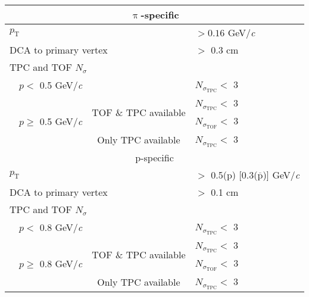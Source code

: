\documentclass[ALICE,manyauthors]{cernphprep}
\newcommand{\Lam}{$\Lambda$\xspace}
\providecommand{\DIFaddtex}[1]{{\protect\color{blue}\uwave{#1}}} %
\providecommand{\DIFdeltex}[1]{{\protect\color{red}\sout{#1}}}                      %
\providecommand{\DIFaddFL}[1]{\DIFadd{#1}} %
\providecommand{\DIFdelFL}[1]{\DIFdel{#1}} %
\providecommand{\DIFaddbeginFL}{} %
\providecommand{\DIFaddendFL}{} %
\providecommand{\DIFdelbeginFL}{} %
\providecommand{\DIFdelendFL}{} %
\providecommand{\DIFadd}[1]{\texorpdfstring{\DIFaddtex{#1}}{#1}} %
\providecommand{\DIFdel}[1]{\texorpdfstring{\DIFdeltex{#1}}{}} %
\begin{document}
\begin{table}[htbp]
\begin{tabular}{lc|c|l}
   
   \DIFdelbeginFL %
\DIFdelendFL \DIFaddbeginFL \multicolumn{4}{c}{$\uppi$-specific} \DIFaddendFL \\
   \hline
   \multicolumn{3}{l|}{$p_{\mathrm{T}}$} & $> 0.16$ GeV/\textit{c} \\
   \hline
   \multicolumn{3}{l|}{DCA to primary vertex} & $>$ 0.3 cm \\
   \hline
   \multicolumn{4}{l}{TPC and TOF $N_{\sigma}$} \\
   \cline{2-4}
    & \multicolumn{1}{c}{$p <$ 0.5 GeV/\textit{c}} &  & \DIFdelbeginFL \DIFdelFL{$N_{\sigma_{\mathrm{TPC}}} <$ }\DIFdelendFL \DIFaddbeginFL \DIFaddFL{$N_{\sigma, \mathrm{TPC}} <$ }\DIFaddendFL 3 \\
   \cline{2-4}
    & \multicolumn{1}{c}{\multirow{3}{*}{$p \geq$ 0.5 GeV/\textit{c}}} &  \multirow{2}{*}{TOF \& TPC available} & \DIFdelbeginFL \DIFdelFL{$N_{\sigma_{\mathrm{TPC}}} <$ }\DIFdelendFL \DIFaddbeginFL \DIFaddFL{$N_{\sigma, \mathrm{TPC}} <$ }\DIFaddendFL 3 \\
    & \multicolumn{2}{c|}{} & \DIFdelbeginFL \DIFdelFL{$N_{\sigma_{\mathrm{TOF}}} <$ }\DIFdelendFL \DIFaddbeginFL \DIFaddFL{$N_{\sigma, \mathrm{TOF}} <$ }\DIFaddendFL 3 \\
   \cline{3-4}
    & \multicolumn{1}{c}{} & Only TPC available & \DIFdelbeginFL \DIFdelFL{$N_{\sigma_{\mathrm{TPC}}} <$ }\DIFdelendFL \DIFaddbeginFL \DIFaddFL{$N_{\sigma, \mathrm{TPC}} <$ }\DIFaddendFL 3 \\
   \hline

   
   \multicolumn{4}{c}{p-specific} \\
   \hline
   \multicolumn{3}{l|}{$p_{\mathrm{T}}$} & $ > $ 0.5(p) [0.3($\overline{\mathrm{p}}$)] GeV/\textit{c} \\
   \hline
   \multicolumn{3}{l|}{DCA to primary vertex} & $>$ 0.1 cm \\
   \hline
   \multicolumn{4}{l}{TPC and TOF $N_{\sigma}$} \\
   \cline{2-4}
    & \multicolumn{1}{c}{$p <$ 0.8 GeV/\textit{c}} & & \DIFdelbeginFL \DIFdelFL{$N_{\sigma_{\mathrm{TPC}}} <$ }\DIFdelendFL \DIFaddbeginFL \DIFaddFL{$N_{\sigma, \mathrm{TPC}} <$ }\DIFaddendFL 3 \\
   \cline{2-4}
    & \multicolumn{1}{c}{\multirow{3}{*}{$p \geq$ 0.8 GeV/\textit{c}}} &  \multirow{2}{*}{TOF \& TPC available} & \DIFdelbeginFL \DIFdelFL{$N_{\sigma_{\mathrm{TPC}}} <$ }\DIFdelendFL \DIFaddbeginFL \DIFaddFL{$N_{\sigma, \mathrm{TPC}} <$ }\DIFaddendFL 3 \\
    & \multicolumn{2}{c|}{} & \DIFdelbeginFL \DIFdelFL{$N_{\sigma_{\mathrm{TOF}}} <$ }\DIFdelendFL \DIFaddbeginFL \DIFaddFL{$N_{\sigma, \mathrm{TOF}} <$ }\DIFaddendFL 3 \\
   \cline{3-4}
    & \multicolumn{1}{c}{} & Only TPC available & \DIFdelbeginFL \DIFdelFL{$N_{\sigma_{\mathrm{TPC}}} <$ }\DIFdelendFL \DIFaddbeginFL \DIFaddFL{$N_{\sigma, \mathrm{TPC}} <$ }\DIFaddendFL 3 \\
   \hline   
  \end{tabular}
 \label{tab:LamCuts} 
\end{table}
\end{document}
